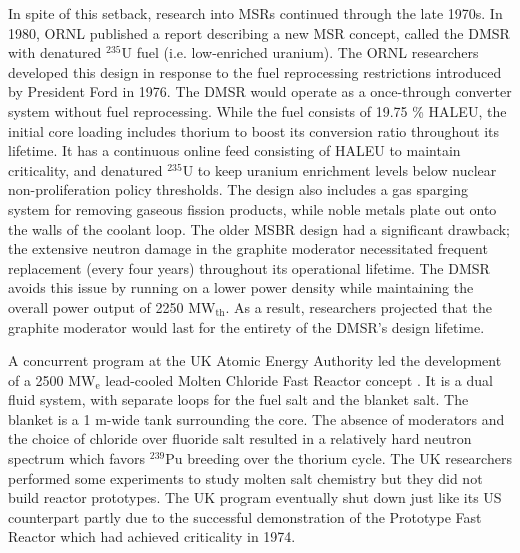 In spite of this setback, research into \glspl{MSR} continued through the late
1970s. In 1980, \gls{ORNL} published a report describing a new \gls{MSR}
concept, called the \gls{DMSR} \cite{gehin_liquid_2016} with denatured
$^{235}$U fuel (i.e. low-enriched uranium). The \gls{ORNL} researchers
developed this design in response to the fuel reprocessing restrictions
introduced by President Ford in 1976. The \gls{DMSR} would operate as a
once-through
converter system without fuel reprocessing. While the fuel consists of 19.75
\% \gls{HALEU}, the initial core loading includes thorium
to boost its conversion ratio throughout its lifetime. It has a continuous
online feed consisting of \gls{HALEU} to maintain criticality, and denatured
$^{235}$U to keep uranium enrichment levels below nuclear non-proliferation
policy thresholds. The design also includes a gas sparging system for removing
gaseous fission products, while noble metals plate out onto the walls of
the coolant loop. The older \gls{MSBR} design had a significant drawback; the
extensive neutron damage in the graphite moderator necessitated frequent
replacement (every four years) throughout its operational lifetime. The
\gls{DMSR} avoids this issue by running on a lower power density while
maintaining
the overall power output of 2250 MW$_{\text{th}}$. As a result, researchers
projected that the graphite moderator would last for the entirety of the
\gls{DMSR}'s design lifetime.

A concurrent program at the UK Atomic Energy Authority led the
development of a 2500 MW$_{\text{e}}$ lead-cooled Molten Chloride Fast Reactor
concept \cite{smith_assessment_1974}. It is a dual fluid system,
with separate loops for the fuel salt and the blanket salt. The blanket is a
1 m-wide tank surrounding the core. The absence of moderators and the choice
of chloride over fluoride salt resulted in a relatively hard neutron spectrum
which favors $^{239}$Pu breeding over the thorium cycle. The UK researchers
performed some experiments to study molten salt chemistry but they did not
build reactor prototypes. The UK program eventually shut down just like its
US counterpart partly due to the successful demonstration of the Prototype
Fast Reactor which had achieved criticality in 1974.

